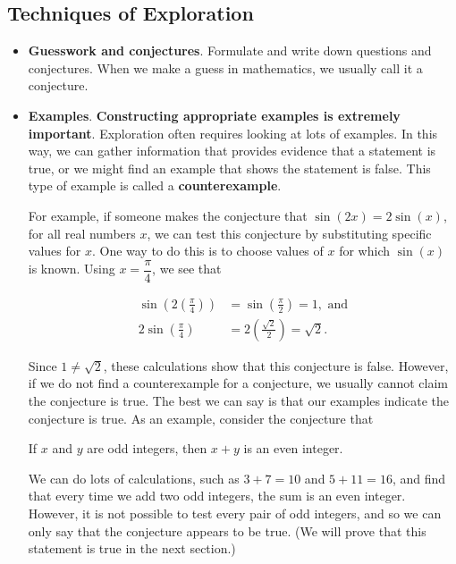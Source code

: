 \subsection*{Techniques of Exploration}
\begin{itemize}
\item \textbf{Guesswork and conjectures}.
Formulate and write down questions and conjectures.  When we make a guess in mathematics, we usually call it a conjecture.
%

\item \textbf{Examples}.
\textbf{Constructing appropriate examples is extremely important}.  Exploration often requires looking at lots of examples.  In this way, we can gather information that provides evidence that a statement is true, or we might find an example that shows the statement is false.  This type of example is called a \textbf{counterexample}.
%

For example, if someone makes the conjecture that $\sin \! \left(2x \right) = 2 \sin (x)$, for all real numbers $x$, we can test this conjecture by substituting specific values for 
$x$.  One way to do this is to choose values of $x$ for which $\sin (x)$ is known.  Using 
$x = \dfrac{\pi}{4}$, we see that

\[
\begin{aligned}
\sin \! \left( 2 \left( \frac{\pi}{4} \right) \right) &= \sin \left(\frac{\pi}{2}\right) = 1, \text{ and} \\
2 \sin \left(\frac{\pi}{4}\right) &= 2 \left( \frac{\sqrt{2}}{2} \right) = \sqrt{2}.
\end{aligned}
\]

Since $1 \ne \sqrt{2}$, these calculations show that this conjecture is false.  However, if we do not find a counterexample for a conjecture, we usually cannot claim the conjecture is true.  The best we can say is that our examples indicate the conjecture is true.  As an example, consider the conjecture that

\begin{center}
If $x$ and $y$ are odd integers, then $x + y$ is an even integer.
\end{center}

We can do lots of calculations, such as $3 + 7 = 10$ and $5 + 11 = 16$, and find that every time we add two odd integers, the sum is an even integer.  However, it is not possible to test every pair of odd integers, and so we can only say that the conjecture appears to be true.  (We will prove that this statement is true in the next section.)


\end{itemize}
